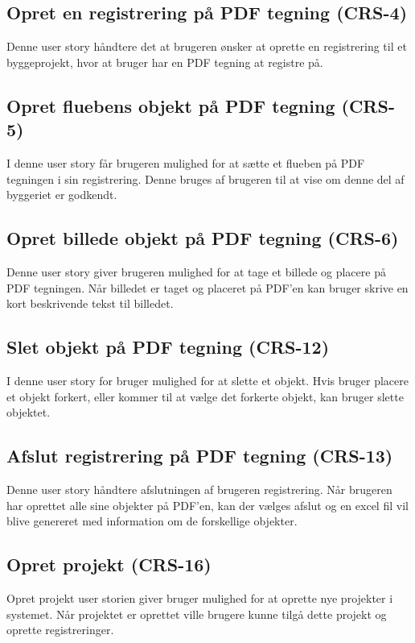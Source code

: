 	\subsection*{Opret en registrering på PDF tegning (CRS-4)}
	Denne user story håndtere det at brugeren ønsker at oprette en registrering til et byggeprojekt, hvor at bruger har en PDF tegning at registre på. 
	
	\subsection*{Opret fluebens objekt på PDF tegning (CRS-5)}
	I denne user story får brugeren mulighed for at sætte et flueben på PDF tegningen i sin registrering. Denne bruges af brugeren til at vise om denne del af byggeriet er godkendt.

	\subsection*{Opret billede objekt på PDF tegning (CRS-6)}
	Denne user story giver brugeren mulighed for at tage et billede og placere på PDF tegningen. Når billedet er taget og placeret på PDF'en kan bruger skrive en kort beskrivende tekst til billedet.
		
	\subsection*{Slet objekt på PDF tegning (CRS-12)}
	I denne user story for bruger mulighed for at slette et objekt. Hvis bruger placere et objekt forkert, eller kommer til at vælge det forkerte objekt, kan bruger slette objektet. 

	\subsection*{Afslut registrering på PDF tegning (CRS-13)}
	Denne user story håndtere afslutningen af brugeren registrering. Når brugeren har oprettet alle sine objekter på PDF'en, kan der vælges afslut og en excel fil vil blive genereret med information om de forskellige objekter.
	
	\subsection*{Opret projekt (CRS-16)}
	Opret projekt user storien giver bruger mulighed for at oprette nye projekter i systemet. Når projektet er oprettet ville brugere kunne tilgå dette projekt og oprette registreringer. \\
	


